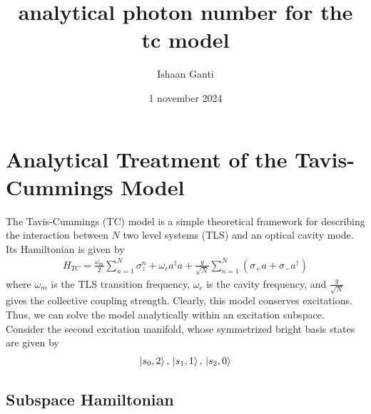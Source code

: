 \documentclass[10pt]{article}
\begin{document}
\title{analytical photon number for the tc model}
\author{Ishaan Ganti}
\date{1 november 2024}
\maketitle

\section{Analytical Treatment of the Tavis-Cummings Model}
The Tavis-Cummings (TC) model is a simple theoretical framework for
describing the interaction between $N$ two level systems (TLS) and an optical
cavity mode. Its Hamiltonian is given by 
\begin{gather}
    H_{TC} = \frac{\omega_m}{2} \sum_{n=1}^{N}  \sigma_z^{n} + \omega_c 
    a^{\dag }a + 
    \frac{g}{\sqrt{N}} \sum_{n=1}^{N} (\sigma_{+}a + \sigma_{-}a^{\dag }) 
\end{gather}
where $\omega_m$ is the TLS transition frequency, $\omega_c$ is the cavity frequency, 
and $\frac{g}{\sqrt{N} }$ gives the collective coupling strength. Clearly, this model
conserves excitations. Thus, we can solve the model analytically within an excitation subspace.
Consider the second excitation manifold, whose symmetrized bright basis states are given by 
\begin{gather}
    \ket{s_0, 2}, \, \ket{s_1, 1}, \,  \ket{s_2, 0} 
\end{gather}

\subsection{Subspace Hamiltonian}
\end{document}
